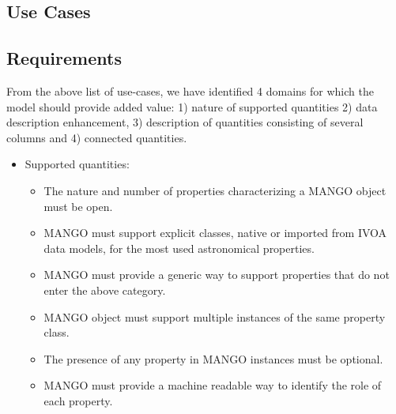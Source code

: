 \documentclass[11pt,a4paper]{ivoa}
\begin{document}
\subsection{Use Cases}


\subsection{Requirements}

From the above list of use-cases, we have identified 4 domains for which
the model should provide added value: 1) nature of supported quantities 2) data description enhancement,
3) description of quantities consisting of several columns and 4) connected quantities.


\begin{itemize}
    \item Supported quantities:
        \begin{itemize}[noitemsep,topsep=0pt,parsep=0pt,partopsep=0pt]
          \item The nature and number of properties characterizing a MANGO object must be open. 
          \item MANGO must support explicit classes, native or imported from IVOA data models,
                for the most used astronomical properties.
          \item MANGO must provide a generic way to support properties that do not enter the above category.
          \item MANGO object must support multiple instances of the same property class.
          \item The presence of any property in MANGO instances must be optional.    
    	  \item MANGO must provide a machine readable way to identify the role of each property.
        
   	    \end{itemize}   
    

\end{itemize}
\end{document}
